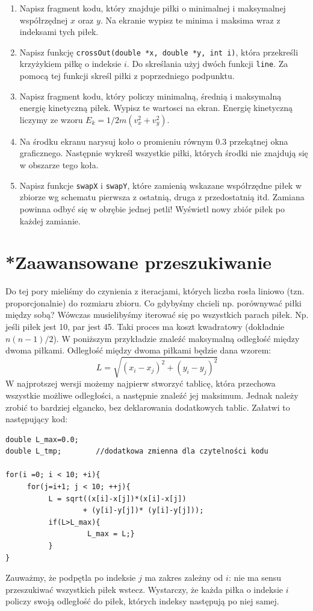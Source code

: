 \documentclass{instrukcja}
\begin{document}
\begin{enumerate}
\item Napisz fragment kodu, który znajduje piłki o minimalnej i maksymalnej współrzędnej \(x\) oraz \(y\). Na ekranie wypisz te minima i maksima wraz z indeksami tych piłek.
\item Napisz funkcję {\tt crossOut(double *x, double *y, int i)}, która przekreśli krzyżykiem piłkę o indeksie \(i\). Do skreślania użyj dwóch funkcji {\tt line}. Za pomocą tej funkcji skreśl piłki z poprzedniego podpunktu. 

\item Napisz fragment kodu, który policzy minimalną, średnią i maksymalną energię kinetyczną piłek. Wypisz te wartosci na ekran.
Energię kinetyczną liczymy ze wzoru \(E_k=1/2m(v_x^2+v_y^2)\). 
\item Na środku ekranu narysuj koło o promieniu równym \(0.3\) przekątnej okna graficznego. Następnie wykreśl wszystkie piłki, których środki nie znajdują się w obszarze tego koła.
\item Napisz funkcje {\tt swapX} i {\tt swapY}, które zamienią wskazane współrzędne piłek w zbiorze wg schematu pierwsza z ostatnią, druga z przedostatnią itd. Zamiana powinna odbyć się w obrębie jednej petli! Wyświetl nowy zbiór piłek po każdej zamianie.
\end{enumerate}

\section{*Zaawansowane przeszukiwanie}
Do tej pory mieliśmy do czynienia z iteracjami, których liczba rosła liniowo (tzn. proporcjonalnie) do rozmiaru zbioru. Co gdybyśmy chcieli np. porównywać piłki między sobą? Wówczas musielibyśmy iterować się po wszystkich parach piłek. Np. jeśli piłek jest 10, par jest 45. Taki proces ma koszt kwadratowy (dokładnie \(n(n-1)/2 \)). W poniższym przykładzie znaleźć maksymalną odległość między dwoma piłkami. Odległość między dwoma piłkami będzie dana wzorem: 
\begin{displaymath}
L=\sqrt{(x_{i}-x_{j})^2 +(y_{i}-y_{j})^2 }
\end{displaymath}
W najprotszej wersji możemy najpierw stworzyć tablicę, która przechowa wszystkie możliwe odległości, a następnie znaleźć jej maksimum. Jednak należy zrobić to bardziej elgancko, bez deklarowania dodatkowych tablic. Załatwi to następujący kod:

\begin{verbatim}
double L_max=0.0;
double L_tmp;        //dodatkowa zmienna dla czytelności kodu

for(i =0; i < 10; +i){
     for(j=i+1; j < 10; ++j){
          L = sqrt((x[i]-x[j])*(x[i]-x[j]) 
                  + (y[i]-y[j])* (y[i]-y[j]));
          if(L>L_max){
                   L_max = L;}
          }
}

\end{verbatim}
Zauważmy, że podpętla po indeksie \(j\) ma zakres zależny od  \(i\): nie ma sensu przeszukiwać wszystkich piłek wstecz. Wystarczy, że każda piłka o indeksie \(i\) policzy swoją odległość do piłek, których indeksy następują po niej samej.
\end{document}

